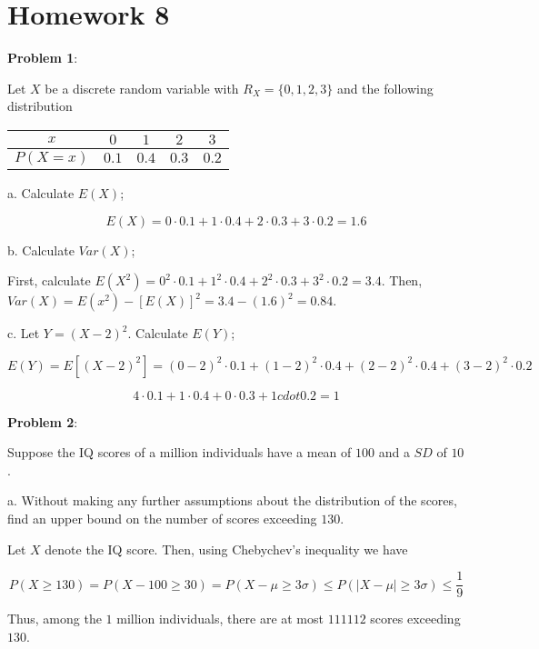 \documentclass{article}
\begin{document}
\section{Homework 8}

\noindent\textbf{Problem 1}:

Let $X$ be a discrete random variable with $R_X=\{0,1,2,3\}$ and the following distribution

\begin{center}
    \begin{tabular}{ |c|c|c|c|c| }
        \hline
        $x$&$0$&$1$&$2$&$3$\\
        \hline
        $P(X=x)$&$0.1$&$0.4$&$0.3$&$0.2$\\
        \hline
    \end{tabular}
\end{center}

\indent\indent a. Calculate $E(X)$;

{\color{blue}

\[E(X)=0\cdot0.1+1\cdot0.4+2\cdot0.3+3\cdot0.2=1.6\]

}

\indent\indent b. Calculate $Var(X)$;

{\color{blue}

First, calculate $E(X^2)=0^2\cdot0.1+1^2\cdot0.4+2^2\cdot0.3+3^2\cdot0.2=3.4$. Then, $Var(X)=E(x^2)-[E(X)]^2=3.4-(1.6)^2=0.84$.

}

\indent\indent c. Let $Y=(X-2)^2$. Calculate $E(Y)$;

{\color{blue}

\[E(Y)=E\left[(X-2)^2\right]=(0-2)^2\cdot0.1+(1-2)^2\cdot0.4+(2-2)^2\cdot0.4+(3-2)^2\cdot0.2\]

\[4\cdot0.1+1\cdot0.4+0\cdot0.3+1cdot0.2=1\]

}

\noindent\textbf{Problem 2}:

Suppose the IQ scores of a million individuals have a mean of $100$ and a $SD$ of $10$. 

\indent\indent a. Without making any further assumptions about the distribution of the scores, find an upper bound on the number of scores exceeding $130$.

{\color{blue}

Let $X$ denote the IQ score. Then, using Chebychev's inequality we have

\[P(X\ge130)=P(X-100\ge30)=P(X-\mu\ge3\sigma)\le P(|X-\mu|\ge3\sigma)\le\frac{1}{9}\]

Thus, among the $1$ million individuals, there are at most $111112$ scores exceeding $130$.

}
\end{document}

